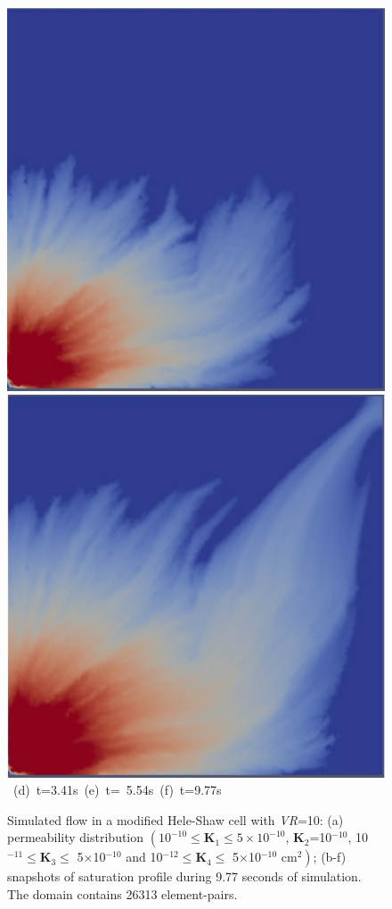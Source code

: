 \begin{landscape}
\begin{figure}[ht]
{{            \includegraphics[width=.45\textwidth]{./Pics1/Saffman_heterogeneous_VR10/ST_Heterog_VR10_D8000Hb.pdf}
            \includegraphics[width=.45\textwidth]{./Pics1/Saffman_heterogeneous_VR10/ST_Heterog_VR10_D13800Hb.pdf} }
      \hbox{\hspace{2.cm} (d) t=3.41s \hspace{3.5cm} (e) t= 5.54s\hspace{4.5cm} (f) t=9.77s }}
\caption{Simulated flow in a modified Hele-Shaw cell with {\it VR}=10: (a) permeability distribution $\left(\text{10}^{-10}\le\mathbf{K}_{1}\le\text{5}\times\text{10}^{-10}\right.$, {\bf K}$_{2}$=10$^{-10}$, 10$^{-11}\le\mathbf{K}_{3}\le$ 5$\times$10$^{-10}$ and 10$^{-12}\le\mathbf{K}_{4}\le$ 5$\times$10$\left.^{-10}\text{ cm}^{2}\right)$; (b-f) snapshots of saturation profile during 9.77 seconds of simulation. The domain contains 26313  element-pairs.}
\label{fig:HeleShawHeter_VR10}
\end{figure}
\end{landscape}
\clearpage


